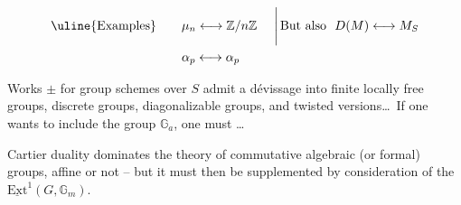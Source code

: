\[
\begin{aligned}
\text{\uline{Examples}}\qquad &\mu_n\longleftrightarrow\mathbb Z/n\mathbb Z
&\ \Bigg|\, &\text{But also }\ D(M)\longleftrightarrow M_S\\
&\alpha_p\longleftrightarrow\alpha_p && 
\end{aligned}
\]

Works $\pm$ for  group schemes  over $S$  admit a dévissage into finite locally free groups, discrete groups, diagonalizable groups, and  twisted versions\ldots\ If one wants to include the group $\mathbb{G}_a$, one must \ldots

Cartier duality dominates the theory of commutative algebraic (or formal) groups, affine or not -- but it must then be supplemented by consideration of the $\underline{\mathrm{Ext}}^1(G,\mathbb{G}_m)$.
\clearpage
